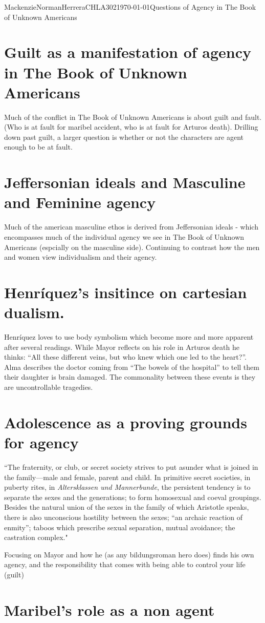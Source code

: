 \documentclass{article}
\begin{document}
\begin{mla}{Mackenzie}{Norman}{Herrera}{CHLA302}{\today}{Questions of Agency in The Book of Unknown Americans}
\section*{Guilt as a manifestation of agency in The Book of Unknown Americans}
Much of the conflict in The Book of Unknown Americans is about guilt and fault. (Who is at fault for maribel accident, who is at fault for Arturos death). Drilling down past guilt, a larger question is whether or not the characters are agent enough to be at fault. 
\section*{Jeffersonian ideals and Masculine and Feminine agency}
Much of the american masculine ethos is derived from Jeffersonian ideals - which encompasses much of the individual agency we see in The Book of Unknown Americans (espcially on the masculine side).  Continuing to contrast how the men and women view individualism and their agency.

\section*{Henríquez's insitince on cartesian dualism.}
Henríquez loves to use body symbolism which become more and more apparent after several readings. While Mayor reflects on his role in Arturos death he thinks: ``All these different veins, but who knew which one led to the heart?''. Alma describes the doctor coming from ``The bowels of the hospital'' to tell them their daughter is brain damaged. The commonality between these events is they are uncontrollable tragedies. 

\section*{Adolescence as a proving grounds for agency}
``The fraternity, or club, or secret society strives to put asunder what is joined in the family—male and female, parent and child. In primitive secret societies, in puberty rites, in \textit{Altersklassen und Mannerbunde}, the persistent tendency is to separate the sexes and the generations; to form homosexual and coeval groupings. Besides the natural union of the sexes in the family of which Aristotle speaks, there is also unconscious hostility between the sexes; ``an archaic reaction of enmity''; taboos which prescribe sexual separation, mutual avoidance; the castration complex."

Focusing on Mayor and how he (as any bildungsroman hero does) finds his own agency, and the responsibility that comes with being able to control your life (guilt)




\section*{Maribel’s role as a non agent}

\printbibliography

\end{mla}
\end{document}
